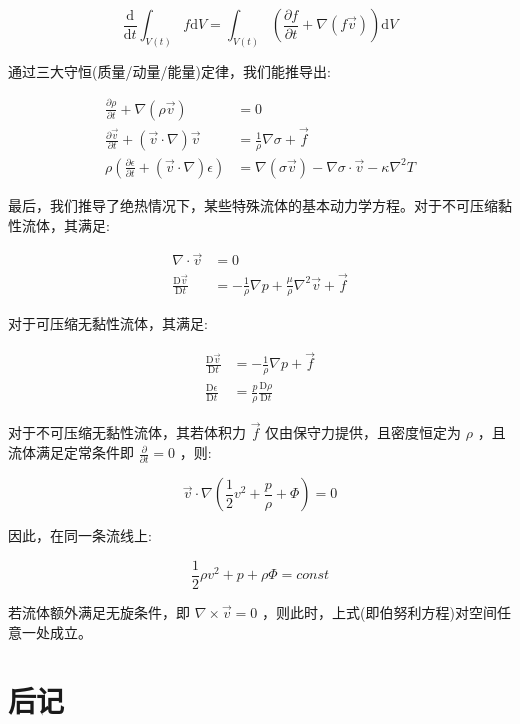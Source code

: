 \documentclass[fontset=windows]{article}
\begin{document}
$$
\frac{\mathrm{d}}{\mathrm{d}t} \int_{V(t)} f \mathrm{d}V
= \int_{V(t)} (\frac{\partial f}{\partial t} + \nabla (f \vec{v})) \mathrm{d}V
$$

通过三大守恒(质量/动量/能量)定律，我们能推导出:

$$
\begin{aligned}
    \frac{\partial \rho}{\partial t} + \nabla (\rho \vec{v}) &= 0 \\
    \frac{\partial \vec{v}}{\partial t} + (\vec{v} \cdot \nabla) \vec{v} &= \frac{1}{\rho} \nabla {\sigma} + \vec{f} \\
    \rho(\frac{\partial \epsilon}{\partial t} + (\vec{v} \cdot \nabla) \epsilon) &= \nabla (\sigma \vec {v}) - \nabla{\sigma} \cdot \vec{v} - \kappa \nabla^2{T}
\end{aligned}
$$

最后，我们推导了绝热情况下，某些特殊流体的基本动力学方程。对于不可压缩黏性流体，其满足:

$$
\begin{aligned}
    \nabla \cdot \vec{v} &= 0 \\
    \frac{\mathrm{D} \vec{v}}{\mathrm{D}t} &= -\frac{1}{\rho}\nabla{p} + \frac{\mu}{\rho}\nabla^2{\vec{v}} + \vec{f}
\end{aligned}
$$

对于可压缩无黏性流体，其满足:

$$
\begin{aligned}
    \frac{\mathrm{D} \vec{v}}{\mathrm{D}t} &= - \frac{1}{\rho} \nabla {p} + \vec{f} \\
    \frac{\mathrm{D}\epsilon}{\mathrm{D}t} &= \frac{p}{\rho} \frac{\mathrm{D}\rho}{\mathrm{D}t}
\end{aligned}
$$

对于不可压缩无黏性流体，其若体积力 $\vec{f}$ 仅由保守力提供，且密度恒定为 $\rho$ ，且流体满足定常条件即 $\frac{\partial}{\partial t} = 0$ ，则:

$$
\vec{v} \cdot \nabla(\frac{1}{2} v^2 + \frac{p}{\rho} + \Phi) = 0
$$

因此，在同一条流线上:

$$
\frac{1}{2} \rho v^2 + p + \rho\Phi = const
$$

若流体额外满足无旋条件，即 $\nabla \times \vec{v} = 0$ ，则此时，上式(即伯努利方程)对空间任意一处成立。

\section{后记}

\end{document}
